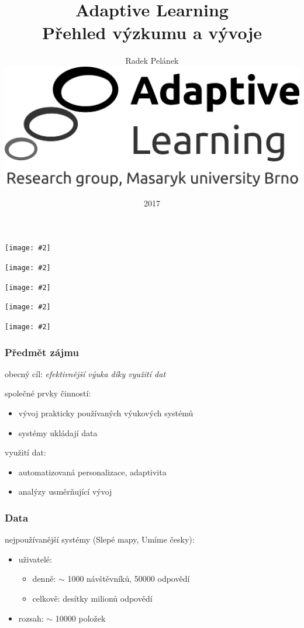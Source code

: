 \documentclass[bigger]{beamer}
\title{Adaptive Learning\\Přehled výzkumu a vývoje}
\author{Radek Pelánek\\[10mm]
  \includegraphics[width=.2\linewidth]{al-logo-researchgroup}}
\date{2017}
\newcommand{\img}[2]{\begin{center}\texttt{[image: \#2]}\end{center}}
\begin{document}
\frame{\titlepage}

\begin{frame}
  \img{1}{slepemapy}
\end{frame}

\begin{frame}
  \img{.9}{anatom}
\end{frame}

\begin{frame}
  \img{.95}{poznavacka}
\end{frame}

\begin{frame}
  \img{.8}{umimecesky}
\end{frame}

\begin{frame}
  \img{.95}{matmat}
\end{frame}

\begin{frame}
  \frametitle{Předmět zájmu}

  obecný cíl: \emph{efektivnější výuka díky využití dat}

  \bigskip

  společné prvky činností:
  \begin{itemize}
  \item vývoj prakticky používaných výukových systémů
  \item systémy ukládají data
  \end{itemize}

  \bigskip

  využití dat:
  \begin{itemize}
  \item automatizovaná personalizace, adaptivita
  \item analýzy usměrňující vývoj
  \end{itemize}
\end{frame}

\begin{frame}
  \frametitle{Data}

  nejpoužívanější systémy (Slepé mapy, Umíme česky):
  \begin{itemize}
  \item uživatelé:
    \begin{itemize}
    \item denně: $\sim$ 1000 návštěvníků, 50000 odpovědí
    \item celkově: desítky milionů odpovědí
    \end{itemize}
  \item rozsah: $\sim$ 10000 položek
  \end{itemize}
\end{frame}
\end{document}

